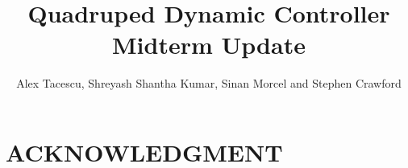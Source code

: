 \documentclass[letterpaper, 10 pt, conference]{ieeeconf}  %
\title{\LARGE \bf
Quadruped Dynamic Controller Midterm Update
}
\author{Alex Tacescu, Shreyash Shantha Kumar, Sinan Morcel and Stephen Crawford}
\begin{document}
\maketitle
\thispagestyle{empty}
\pagestyle{empty}














\addtolength{\textheight}{-12cm}   %



\section*{ACKNOWLEDGMENT}
\end{document}

